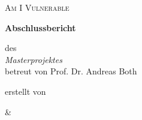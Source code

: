 \begin{titlepage}
    \centering
    \par\vspace{3cm}
    {\scshape\huge Am I Vulnerable\par}
    \vspace{1.5cm}
    {\Huge\bfseries Abschlussbericht\par}
    \vspace{2cm}
    {\Large des\\\textit{Masterprojektes}\\betreut von Prof. Dr. Andreas Both\par}
    \vspace{12cm}
    erstellt von\par
    \autorFirstNameK\textsc{ \autorFamilyNameK} \par
    \& \par
    \autorFirstNameT\textsc{ \autorFamilyNameT} \par
    \vfill
\end{titlepage}
